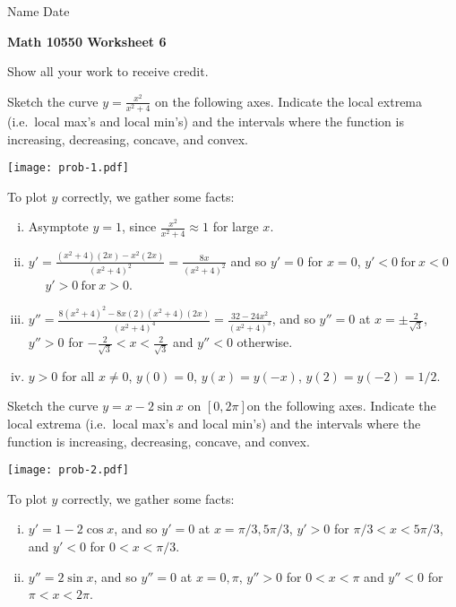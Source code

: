 \documentclass[12pt]{article}
\begin{document}
\hskip0.01in Name \underline{\hskip 4.5in}
\hskip0.2in
  Date \underline{\hskip 1in}


\begin{center}
\textbf{Math 10550 Worksheet 6}

Show all your work to receive credit.
\end{center}

\noindent
 

 Sketch the curve $\displaystyle y = \frac{x^{2}}{x^2 +
    4}$ on the following axes. Indicate the local extrema (i.e.\ local max's and
local min's) and the intervals where the function is
increasing, decreasing, concave, and convex. 
\vspace{-16em}
\begin{center}
\texttt{[image: prob-1.pdf]}
\end{center}
\vspace{-16em}
To plot $y$ correctly, we gather some facts:
\begin{enumerate}[i)]
\item{} Asymptote $y=1$, since $\displaystyle \frac{x^{2}}{x^{2} + 4} \approx 1$ for large $x$. 
\item{}
    $ \displaystyle y'
    = \frac{(x^{2} + 4)(2x) - x^{2}(2x)}{(x^{2} + 4)^{2}}
    = \frac{8x}{(x^{2} + 4)^{2}}$
    and so
    $ \displaystyle y' = 0$ for $ x=0$, $y' < 0 \ \text{for} \  x < 0$
    \  \ 
    $y' > 0 \ \text{for} \  x > 0$.
    \item{}
      $\displaystyle y'' = \frac{8(x^{2} + 4)^{2} - 8x(2)(x^{2} +
    4)(2x)}{(x^{2} + 4)^{4}} = \frac{32 - 24x^{2}}{(x^{2} + 4)^{3}}$, and so
    $y'' = 0$ at $\displaystyle x = \pm \frac{2}{\sqrt{3}}$, $y'' > 0$ for
    $ \displaystyle
    -\frac{2}{\sqrt{3}} < x < \frac{2}{\sqrt{3}}$ and $y'' <0$ otherwise. 
  \item{}
    $y>0$ for all $x \neq 0$, $y(0) = 0$, $y(x) = y(-x)$, $y(2) = y(-2) = 1/2$.
\end{enumerate}
\newpage
\noindent
{} Sketch the curve $\displaystyle y=x - 2\sin x$ on $[0, 2\pi]$on the following axes. Indicate the local extrema (i.e.\ local max's and
local min's) and the intervals where the function is
increasing, decreasing, concave, and convex. 
\vspace{-16em}
\begin{center}
    \texttt{[image: prob-2.pdf]}
\end{center}
\vspace{-16em}
To plot $y$ correctly, we gather some facts:
\begin{enumerate}[i)]
\item{}
        $ \displaystyle y' = 1 - 2 \cos x$, and so
        $\displaystyle y'=0$ at $x = \pi/3, 5\pi/3$, $y' > 0$ for $\pi/3< x < 5\pi/3$, and $y' < 0$ for $0 < x < \pi/3$. 
        \item{}
        $y'' = 2 \sin x$, and so $y''= 0$ at $x = 0, \pi$, $y'' > 0$ for $0 < x < \pi$ and $y'' < 0$ for $\pi < x < 2 \pi$.
\end{enumerate}
\end{document}
